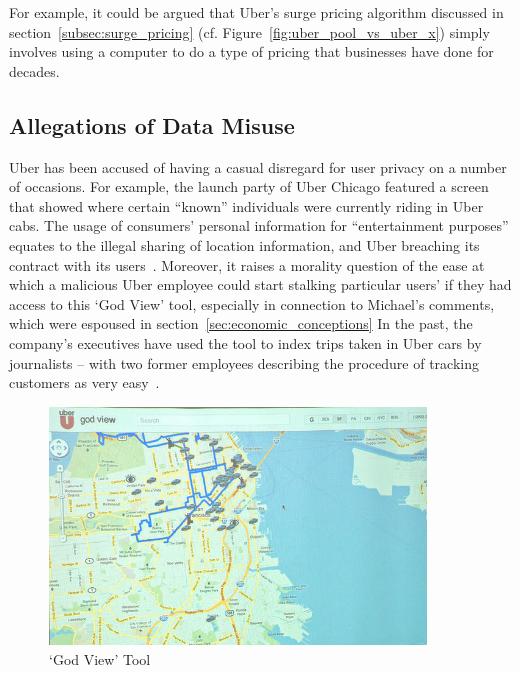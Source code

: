         For example, it could be argued that Uber's surge pricing algorithm discussed in section~\ref{subsec:surge_pricing} (cf. Figure~\ref{fig:uber_pool_vs_uber_x}) simply involves using a computer to do a type of pricing that businesses have done for decades.

      \subsection{Allegations of Data Misuse}\label{subsec:allegations_of_data_misuse}

        Uber has been accused of having a casual disregard for user privacy on a number of occasions. For example, the launch party of Uber Chicago featured a screen that showed where certain ``known'' individuals were currently riding in Uber cabs. The usage of consumers’ personal information for ``entertainment purposes'' equates to the illegal sharing of location information, and Uber breaching its contract with its users~\parencite{sims2014}. Moreover, it raises a morality question of the ease at which a malicious Uber employee could start stalking particular users' if they had access to this `God View' tool, especially in connection to Michael's comments, which were espoused in section~\ref{sec:economic_conceptions} In the past, the company's executives have used the tool to index trips taken in Uber cars by journalists -- with two former employees describing the procedure of tracking customers as very easy~\parencite{canedo2014}.

        \begin{figure}
          \centering
          \begin{minipage}{10cm}
            \centering
            \includegraphics[width=10cm]{inc/god_view_tool.png}
            \caption[`God View' Tool]{`God View' Tool~\parencite{uber2011}}
            \label{fig:god_view_tool}
          \end{minipage}
        \end{figure}

